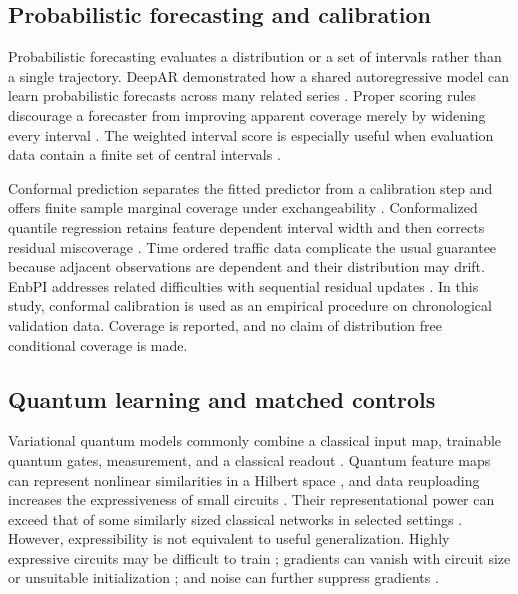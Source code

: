 \documentclass[pdflatex,sn-mathphys-num]{sn-jnl}
\begin{document}
\subsection{Probabilistic forecasting and calibration}\label{subsec:probabilistic}

Probabilistic forecasting evaluates a distribution or a set of intervals rather than a single trajectory. DeepAR demonstrated how a shared autoregressive model can learn probabilistic forecasts across many related series \cite{salinas2020deepar}. Proper scoring rules discourage a forecaster from improving apparent coverage merely by widening every interval \cite{gneiting2007scoring}. The weighted interval score is especially useful when evaluation data contain a finite set of central intervals \cite{bracher2021wis}.

Conformal prediction separates the fitted predictor from a calibration step and offers finite sample marginal coverage under exchangeability \cite{angelopoulos2023conformal}. Conformalized quantile regression retains feature dependent interval width and then corrects residual miscoverage \cite{romano2019cqr}. Time ordered traffic data complicate the usual guarantee because adjacent observations are dependent and their distribution may drift. EnbPI addresses related difficulties with sequential residual updates \cite{xu2021enbpi}. In this study, conformal calibration is used as an empirical procedure on chronological validation data. Coverage is reported, and no claim of distribution free conditional coverage is made.

\subsection{Quantum learning and matched controls}\label{subsec:qml}

Variational quantum models commonly combine a classical input map, trainable quantum gates, measurement, and a classical readout \cite{biamonte2017qml,cerezo2021vqa}. Quantum feature maps can represent nonlinear similarities in a Hilbert space \cite{havlicek2019feature}, and data reuploading increases the expressiveness of small circuits \cite{perezsalinas2020reuploading}. Their representational power can exceed that of some similarly sized classical networks in selected settings \cite{abbas2021power}. However, expressibility is not equivalent to useful generalization. Highly expressive circuits may be difficult to train \cite{sim2019expressibility}; gradients can vanish with circuit size or unsuitable initialization \cite{mcclean2018barren}; and noise can further suppress gradients \cite{wang2021noisebp}.
\end{document}
